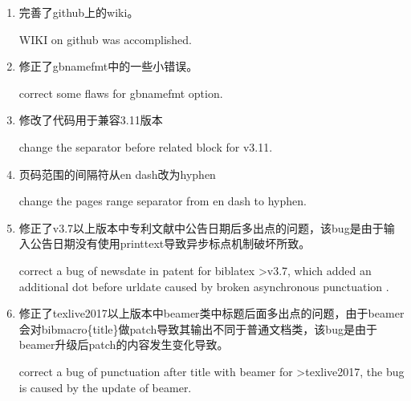 
\label{up:180403}
\begin{enumerate}
\item 完善了github上的wiki。

WIKI on github was accomplished.

\item 修正了gbnamefmt中的一些小错误。

correct some flaws for gbnamefmt option.

\item 修改了代码用于兼容3.11版本

change the separator before related block for v3.11.

\item 页码范围的间隔符从en dash改为hyphen

change the pages range separator from en dash to hyphen.
	
\item 修正了v3.7以上版本中专利文献中公告日期后多出点的问题，该bug是由于输入公告日期没有使用printtext导致异步标点机制破坏所致。

correct a bug of newsdate in patent for biblatex >v3.7, which added an additional dot before urldate caused by broken asynchronous punctuation .

\item 修正了texlive2017以上版本中beamer类中标题后面多出点的问题，由于beamer会对bibmacro\{title\}做patch导致其输出不同于普通文档类，该bug是由于beamer升级后patch的内容发生变化导致。

correct a bug of punctuation after title with beamer for >texlive2017, the bug is caused by the update of beamer.
\end{enumerate}

